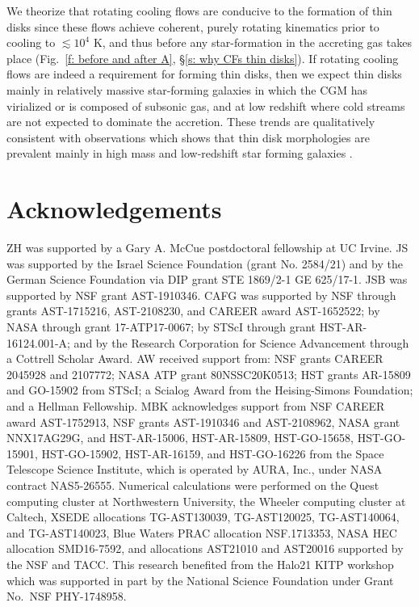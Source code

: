 \documentclass[fleqn,usenatbib]{mnras}
\begin{document}
\begin{enumerate}
    We theorize that rotating cooling flows are conducive to the formation of thin disks since these flows achieve coherent, purely rotating kinematics prior to cooling to $\lesssim10^4$ K, and thus before any star-formation in the accreting gas takes place (Fig.~\ref{f: before and after A}, \S\ref{s: why CFs thin disks}).
    If rotating cooling flows are indeed a requirement for forming thin disks, then we expect thin disks mainly in relatively massive star-forming galaxies in which the CGM has virialized or is composed of subsonic gas, and at low redshift where cold streams are not expected to dominate the accretion.
    These trends are qualitatively consistent with observations which shows that thin disk morphologies are prevalent mainly in high mass and low-redshift star forming galaxies \citep{Kassin2012, Simons2017}. 
\end{enumerate}

\section*{Acknowledgements}

ZH was supported by a Gary A. McCue postdoctoral fellowship at UC Irvine.
JS was supported by the Israel Science Foundation (grant No. 2584/21) and by the German Science Foundation via DIP grant STE 1869/2-1 GE 625/17-1. 
JSB was supported by NSF grant AST-1910346.
CAFG was supported by NSF through grants AST-1715216, AST-2108230,  and CAREER award AST-1652522; by NASA through grant 17-ATP17-0067; by STScI through grant HST-AR-16124.001-A; and by the Research Corporation for Science Advancement through a Cottrell Scholar Award.
AW received support from: NSF grants CAREER 2045928 and 2107772; NASA ATP grant 80NSSC20K0513; HST grants AR-15809 and GO-15902 from STScI; a Scialog Award from the Heising-Simons Foundation; and a Hellman Fellowship.
MBK acknowledges support from NSF CAREER award AST-1752913, NSF grants AST-1910346 and AST-2108962, NASA grant NNX17AG29G, and HST-AR-15006, HST-AR-15809, HST-GO-15658, HST-GO-15901, HST-GO-15902, HST-AR-16159, and HST-GO-16226 from the Space Telescope Science Institute, which is operated by AURA, Inc., under NASA contract NAS5-26555.
Numerical calculations were performed on the Quest computing cluster at Northwestern University, the Wheeler computing cluster at Caltech, XSEDE allocations TG-AST130039, TG-AST120025, TG-AST140064, and TG-AST140023, Blue Waters PRAC allocation NSF.1713353, NASA HEC allocation SMD16-7592, and allocations AST21010 and AST20016 supported by the NSF and TACC.
This research benefited from the Halo21 KITP workshop which was supported in part by the National Science Foundation under Grant No.~NSF PHY-1748958.
\end{document}
